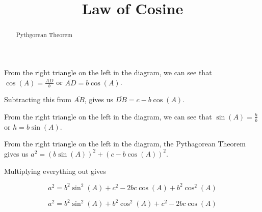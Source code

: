 \documentclass{ximera}
\title{Law of Cosine}
\begin{document}
\begin{abstract}
Pythgorean Theorem
\end{abstract}
\maketitle












\begin{image}[3in]
  \end{image}




From the right triangle on the left in the diagram, we can see that $\cos(A) = \frac{\overline{AD}}{b}$ or $\overline{AD} = b \cos(A)$.


Subtracting this from $\overline{AB}$, gives us $\overline{DB} = c - b \cos(A)$.


From the right triangle on the left in the diagram, we can see that $\sin(A) = \frac{h}{b}$ or $h = b \sin(A)$.




From the right triangle on the left in the diagram, the Pythagorean Theorem gives us $a^2 = (b \sin(A))^2 + (c - b \cos(A))^2$.


Multiplying everything out gives


\[    a^2 = b^2 \sin^2(A) +  c^2  - 2 b c \cos(A) + b^2 \cos^2(A)  \]


\[    a^2 = b^2 \sin^2(A) + b^2 \cos^2(A) +  c^2  - 2 b c \cos(A)   \]
\end{document}
